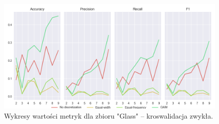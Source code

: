 
\begin{figure}[H]
\center
    \includegraphics[width=\textwidth]{img/cv_scores_kfold/scoring_kfold_glass.png}
    \caption{Wykresy wartości metryk dla zbioru "Glass" -- kroswalidacja zwykła.}
\end{figure}

